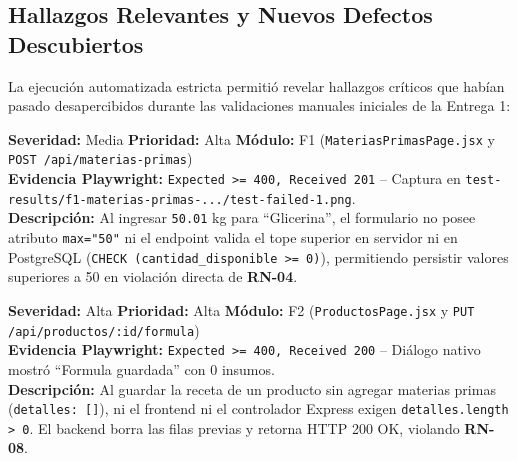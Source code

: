\documentclass[11pt,a4paper]{article}
\begin{document}
\subsection{Hallazgos Relevantes y Nuevos Defectos Descubiertos}
La ejecución automatizada estricta permitió revelar hallazgos críticos que habían pasado desapercibidos durante las validaciones manuales iniciales de la Entrega 1:

\begin{tcolorbox}[colback=lightgray,colframe=accentred,title=\textbf{Defecto Nuevo DEF-02: Violación del Tope Máximo de Stock (F1-CP-05 / RN-04)}]
\small
\textbf{Severidad:} Media \quad \textbf{Prioridad:} Alta \quad \textbf{Módulo:} F1 (\texttt{MateriasPrimasPage.jsx} y \texttt{POST /api/materias-primas})\\
\textbf{Evidencia Playwright:} \texttt{Expected >= 400, Received 201} -- Captura en \texttt{test-results/f1-materias-primas-.../test-failed-1.png}.\\
\textbf{Descripción:} Al ingresar \texttt{50.01} kg para ``Glicerina'', el formulario no posee atributo \texttt{max="50"} ni el endpoint valida el tope superior en servidor ni en PostgreSQL (\texttt{CHECK (cantidad\_disponible >= 0)}), permitiendo persistir valores superiores a 50 en violación directa de \textbf{RN-04}.
\end{tcolorbox}

\begin{tcolorbox}[colback=lightgray,colframe=accentred,title=\textbf{Defecto Nuevo DEF-03: Aceptación de Fórmulas Vacías (F2-CP-02 / RN-08)}]
\small
\textbf{Severidad:} Alta \quad \textbf{Prioridad:} Alta \quad \textbf{Módulo:} F2 (\texttt{ProductosPage.jsx} y \texttt{PUT /api/productos/:id/formula})\\
\textbf{Evidencia Playwright:} \texttt{Expected >= 400, Received 200} -- Diálogo nativo mostró ``Formula guardada'' con 0 insumos.\\
\textbf{Descripción:} Al guardar la receta de un producto sin agregar materias primas (\texttt{detalles: []}), ni el frontend ni el controlador Express exigen \texttt{detalles.length > 0}. El backend borra las filas previas y retorna HTTP 200 OK, violando \textbf{RN-08}.
\end{tcolorbox}
\end{document}
